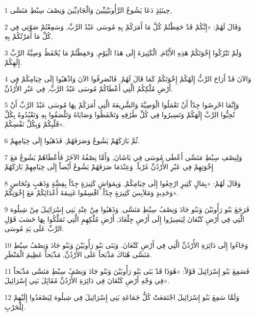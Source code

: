 \par 1 حِينَئِذٍ دَعَا يَشُوعُ الرَّأُوبَيْنِيِّينَ وَالْجَادِيِّينَ وَنِصْفَ سِبْطِ مَنَسَّى,
\par 2 وَقَالَ لَهُمْ: «إِنَّكُمْ قَدْ حَفِظْتُمْ كُلَّ مَا أَمَرَكُمْ بِهِ مُوسَى عَبْدُ الرَّبِّ, وَسَمِعْتُمْ صَوْتِي فِي كُلِّ مَا أَمَرْتُكُمْ بِهِ,
\par 3 وَلَمْ تَتْرُكُوا إِخْوَتَكُمْ هَذِهِ الأَيَّامَ, الْكَثِيرَةَ إِلَى هَذَا الْيَوْمِ, وَحَفِظْتُمْ مَا يُحْفَظُ وَصِيَّةُ الرَّبِّ إِلَهِكُمْ.
\par 4 وَالآنَ قَدْ أَرَاحَ الرَّبُّ إِلَهُكُمْ إِخْوَتَكُمْ كَمَا قَالَ لَهُمْ. فَانْصَرِفُوا الآنَ وَاذْهَبُوا إِلَى خِيَامِكُمْ فِي أَرْضِ مُلْكِكُمُ الَّتِي أَعْطَاكُمْ مُوسَى عَبْدُ الرَّبِّ, فِي عَبْرِ الأُرْدُنِّ.
\par 5 وَإِنَّمَا احْرِصُوا جِدّاً أَنْ تَعْمَلُوا الْوَصِيَّةَ وَالشَّرِيعَةَ الَّتِي أَمَرَكُمْ بِهَا مُوسَى عَبْدُ الرَّبِّ أَنْ تُحِبُّوا الرَّبَّ إِلَهَكُمْ وَتَسِيرُوا فِي كُلِّ طُرُقِهِ وَتَحْفَظُوا وَصَايَاهُ وَتَلْصَقُوا بِهِ وَتَعْبُدُوهُ بِكُلِّ قَلْبِكُمْ وَبِكُلِّ نَفْسِكُمْ».
\par 6 ثُمَّ بَارَكَهُمْ يَشُوعُ وَصَرَفَهُمْ, فَذَهَبُوا إِلَى خِيَامِهِمْ.
\par 7 وَلِنِصْفِ سِبْطِ مَنَسَّى أَعْطَى مُوسَى فِي بَاشَانَ, وَأَمَّا نِصْفُهُ الآخَرُ فَأَعْطَاهُمْ يَشُوعُ مَعَ إِخْوَتِهِمْ فِي عَبْرِ الأُرْدُنِّ غَرْباً. وَعِنْدَمَا صَرَفَهُمْ يَشُوعُ أَيْضاً إِلَى خِيَامِهِمْ بَارَكَهُمْ
\par 8 وَقَالَ لَهُمْ: «بِمَالٍ كَثِيرٍ ارْجِعُوا إِلَى خِيَامِكُمْ, وَبِمَوَاشٍ كَثِيرَةٍ جِدّاً بِفِضَّةٍ وَذَهَبٍ وَنُحَاسٍ وَحَدِيدٍ وَمَلاَبِسَ كَثِيرَةٍ جِدّاً. اقْسِمُوا غَنِيمَةَ أَعْدَائِكُمْ مَعَ إِخْوَتِكُمْ».
\par 9 فَرَجَعَ بَنُو رَأُوبَيْنَ وَبَنُو جَادَ وَنِصْفُ سِبْطِ مَنَسَّى, وَذَهَبُوا مِنْ عِنْدِ بَنِي إِسْرَائِيلَ مِنْ شِيلُوهَ الَّتِي فِي أَرْضِ كَنْعَانَ لِيَسِيرُوا إِلَى أَرْضِ جِلْعَادَ, أَرْضِ مُلْكِهِمِ الَّتِي تَمَلَّكُوا بِهَا حَسَبَ قَوْلِ الرَّبِّ عَلَى يَدِ مُوسَى.
\par 10 وَجَاءُوا إِلَى دَائِرَةِ الأُرْدُنِّ الَّتِي فِي أَرْضِ كَنْعَانَ. وَبَنَى بَنُو رَأُوبَيْنَ وَبَنُو جَادَ وَنِصْفُ سِبْطِ مَنَسَّى هُنَاكَ مَذْبَحاً عَلَى الأُرْدُنِّ, مَذْبَحاً عَظِيمَ الْمَنْظَرِ.
\par 11 فَسَمِعَ بَنُو إِسْرَائِيلَ قَوْلاً: «هُوَذَا قَدْ بَنَى بَنُو رَأُوبَيْنَ وَبَنُو جَادَ وَنِصْفُ سِبْطِ مَنَسَّى مَذْبَحاً فِي وَجْهِ أَرْضِ كَنْعَانَ فِي دَائِرَةِ الأُرْدُنِّ مُقَابَِلَ بَنِي إِسْرَائِيلَ».
\par 12 وَلَمَّا سَمِعَ بَنُو إِسْرَائِيلَ اجْتَمَعَتْ كُلُّ جَمَاعَةِ بَنِي إِسْرَائِيلَ فِي شِيلُوهَ لِيَصْعَدُوا إِلَيْهِمْ لِلْحَرْبِ.
